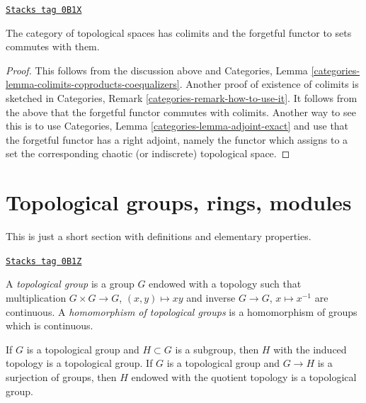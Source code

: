 \begin{lemma}[Colimits]
\label{topology-lemma-colimits}
\href{https://stacks.math.columbia.edu/tag/0B1X}{\texttt{Stacks tag 0B1X}}

The category of topological spaces has colimits and the forgetful functor
to sets commutes with them.
\end{lemma}

\begin{proof}
This follows from the discussion above and
Categories, Lemma \ref{categories-lemma-colimits-coproducts-coequalizers}.
Another proof of existence of colimits is sketched in
Categories, Remark \ref{categories-remark-how-to-use-it}.
It follows from the above that the forgetful functor
commutes with colimits. Another way to see this is to use
Categories, Lemma \ref{categories-lemma-adjoint-exact} and use that
the forgetful functor has a right adjoint, namely the functor which
assigns to a set the corresponding chaotic (or indiscrete) topological space.
\end{proof}

\section{Topological groups, rings, modules}
\label{topology-section-topological-groups}
This is just a short section with definitions and elementary properties.

\begin{definition}
\label{topology-definition-topological-group}
\href{https://stacks.math.columbia.edu/tag/0B1Z}{\texttt{Stacks tag 0B1Z}}

A {\it topological group} is a group $G$ endowed with a topology
such that multiplication $G \times G \to G$, $(x, y) \mapsto xy$ and
inverse $G \to G$, $x \mapsto x^{-1}$ are continuous.
A {\it homomorphism of topological groups} is a homomorphism of groups
which is continuous.
\end{definition}

If $G$ is a topological group and $H \subset G$ is a subgroup,
then $H$ with the induced topology is a topological group.
If $G$ is a topological group and $G \to H$ is a surjection of
groups, then $H$ endowed with the quotient topology is a topological
group.

